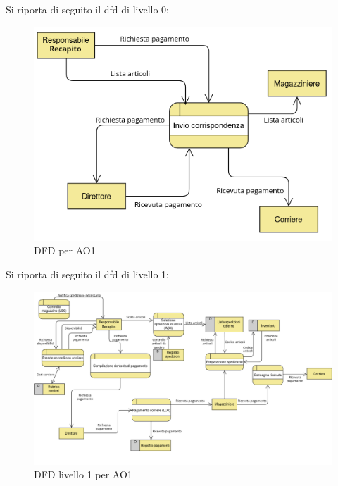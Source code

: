 Si riporta di seguito il dfd di livello 0:
\begin{figure}[H]
  \centering
  \includegraphics[width=0.8\linewidth]{assets/dfd_0_AO1.png}
  \caption{DFD per AO1}
\end{figure}
Si riporta di seguito il dfd di livello 1:
\begin{figure}[H]
  \centering
  \includegraphics[width=0.8\linewidth]{assets/dfd_1_AO1.png}
  \caption{DFD livello 1 per AO1}
\end{figure}

